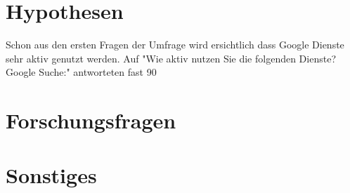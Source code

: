 \section{Hypothesen}

Schon aus den ersten Fragen der Umfrage wird ersichtlich dass Google Dienste sehr aktiv genutzt werden. Auf "Wie aktiv nutzen Sie die folgenden Dienste? Google Suche:" antworteten fast 90%

\section{Forschungsfragen}

\section{Sonstiges}
